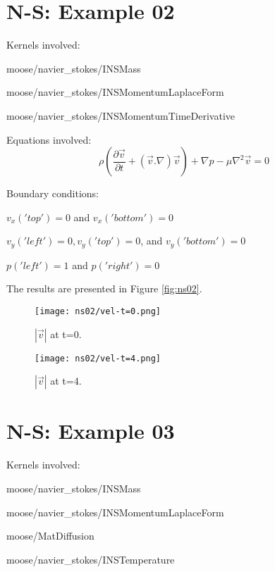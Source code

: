 \documentclass[11pt,letterpaper]{article}
\begin{document}
\section{N-S: Example 02}

Kernels involved:
\begin{description}[font=$\bullet$\scshape\bfseries]
	\item[] moose/navier\_stokes/INSMass
	\item[] moose/navier\_stokes/INSMomentumLaplaceForm
	\item[] moose/navier\_stokes/INSMomentumTimeDerivative
\end{description}

Equations involved:
\begin{equation}
\rho (\frac{\partial \vec{v}}{\partial t}+(\vec{v} . \nabla)\vec{v})+\nabla p - \mu \nabla^{2}\vec{v}=0
\end{equation}

Boundary conditions:
\begin{description}[]
	\item[] $v_{x}('top')=0$ and $v_{x}('bottom')=0$
	\item[] $v_{y}('left')=0, v_{y}('top')=0$, and $v_{y}('bottom')=0$
	\item[] $p('left')=1$ and $p('right')=0$
\end{description}

The results are presented in Figure \ref{fig:ns02}.
\begin{figure*}[!h]
	\centering
	\begin{subfigure}[t]{0.4\textwidth}
		\centering
		\texttt{[image: ns02/vel-t=0.png]} 
		\caption{$|\vec{v}|$ at t=0.}
		\label{fig:ns02-v-1}
	\end{subfigure}
	\vspace{1cm}
	\begin{subfigure}[t]{0.4\textwidth}
		\centering
		\texttt{[image: ns02/vel-t=4.png]}
		\caption{$|\vec{v}|$ at t=4.}
		\label{fig:ns02-v-5}
	\end{subfigure}
	\hfill
	\caption{Flux2.}
	\label{fig:ns02}
\end{figure*}

\section{N-S: Example 03}

Kernels involved:
\begin{description}[font=$\bullet$\scshape\bfseries]
	\item[] moose/navier\_stokes/INSMass
	\item[] moose/navier\_stokes/INSMomentumLaplaceForm
	\item[] moose/MatDiffusion
	\item[] moose/navier\_stokes/INSTemperature
\end{description}
\end{document}
